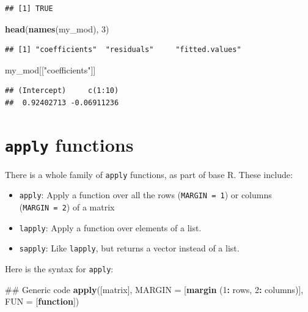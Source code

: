 \documentclass[]{book}
\makeatletter
\newenvironment{Shaded}{\begin{snugshade}}{\end{snugshade}}
\newcommand{\KeywordTok}[1]{\textcolor[rgb]{0.13,0.29,0.53}{\textbf{#1}}}
\newcommand{\DataTypeTok}[1]{\textcolor[rgb]{0.13,0.29,0.53}{#1}}
\newcommand{\DecValTok}[1]{\textcolor[rgb]{0.00,0.00,0.81}{#1}}
\newcommand{\StringTok}[1]{\textcolor[rgb]{0.31,0.60,0.02}{#1}}
\newcommand{\ControlFlowTok}[1]{\textcolor[rgb]{0.13,0.29,0.53}{\textbf{#1}}}
\newcommand{\OperatorTok}[1]{\textcolor[rgb]{0.81,0.36,0.00}{\textbf{#1}}}
\newcommand{\NormalTok}[1]{#1}
\providecommand{\tightlist}{%
  \setlength{\itemsep}{0pt}\setlength{\parskip}{0pt}}
\newenvironment{kframe}{%
\medskip{}
\setlength{\fboxsep}{.8em}
 \def\at@end@of@kframe{}%
 \ifinner\ifhmode%
  \def\at@end@of@kframe{\end{minipage}}%
  \begin{minipage}{\columnwidth}%
 \fi\fi%
 \def\FrameCommand##1{\hskip\@totalleftmargin \hskip-\fboxsep
 \colorbox{shadecolor}{##1}\hskip-\fboxsep
     \hskip-\linewidth \hskip-\@totalleftmargin \hskip\columnwidth}%
 \MakeFramed {\advance\hsize-\width
   \@totalleftmargin\z@ \linewidth\hsize
   \@setminipage}}%
 {\par\unskip\endMakeFramed%
 \at@end@of@kframe}
\renewenvironment{Shaded}{\begin{kframe}}{\end{kframe}}
\theoremstyle{definition}
\theoremstyle{definition}
\theoremstyle{definition}
\theoremstyle{remark}
\makeatother
\begin{document}
\begin{verbatim}
## [1] TRUE
\end{verbatim}

\begin{Shaded}
\begin{Highlighting}[]
\KeywordTok{head}\NormalTok{(}\KeywordTok{names}\NormalTok{(my_mod), }\DecValTok{3}\NormalTok{)}
\end{Highlighting}
\end{Shaded}

\begin{verbatim}
## [1] "coefficients"  "residuals"     "fitted.values"
\end{verbatim}

\begin{Shaded}
\begin{Highlighting}[]
\NormalTok{my_mod[[}\StringTok{"coefficients"}\NormalTok{]]}
\end{Highlighting}
\end{Shaded}

\begin{verbatim}
## (Intercept)     c(1:10) 
##  0.92402713 -0.06911236
\end{verbatim}

\section{\texorpdfstring{\texttt{apply}
functions}{apply functions}}\label{apply-functions}

There is a whole family of \texttt{apply} functions, as part of base R.
These include:

\begin{itemize}
\tightlist
\item
  \texttt{apply}: Apply a function over all the rows
  (\texttt{MARGIN\ =\ 1}) or columns (\texttt{MARGIN\ =\ 2}) of a matrix
\item
  \texttt{lapply}: Apply a function over elements of a list.
\item
  \texttt{sapply}: Like \texttt{lapply}, but returns a vector instead of
  a list.
\end{itemize}

Here is the syntax for \texttt{apply}:

\begin{Shaded}
\begin{Highlighting}[]
\NormalTok{## Generic code}
\KeywordTok{apply}\NormalTok{([matrix], }\DataTypeTok{MARGIN =}\NormalTok{ [}\KeywordTok{margin}\NormalTok{ (}\DecValTok{1}\OperatorTok{:}\StringTok{ }\NormalTok{rows, }\DecValTok{2}\OperatorTok{:}\StringTok{ }\NormalTok{columns)],}
      \DataTypeTok{FUN =}\NormalTok{  [}\ControlFlowTok{function}\NormalTok{])}
\end{Highlighting}
\end{Shaded}
\end{document}
